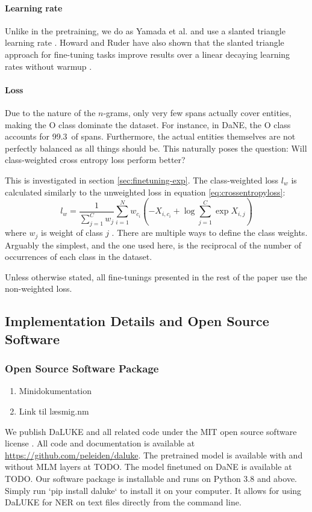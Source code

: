 \documentclass[main.tex]{subfiles}
\begin{document}
\paragraph{Learning rate}
Unlike in the pretraining, we do as Yamada et al. and use a slanted triangle learning rate \cite{yamada2020luke}.
Howard and Ruder have also shown that the slanted triangle approach for fine-tuning tasks improve results over a linear decaying learning rates without warmup \cite{howardruder2018universal}.

\paragraph{Loss}
Due to the nature of the $ n $-grams, only very few spans actually cover entities, making the O class dominate the dataset.
For instance, in DaNE, the O class accounts for 99.3\pro\ of spans.
Furthermore, the actual entities themselves are not perfectly balanced as all things should be.
This naturally poses the question: Will class-weighted cross entropy loss perform better?

This is investigated in section \ref{sec:finetuning-exp}.
The class-weighted loss $ l_w $ is calculated similarly to the unweighted loss in equation \eqref{eq:crossentropyloss}:
\begin{equation}\label{eq:w-crossentropyloss}
    l_w = \frac{1}{\sum_{j=1}^{C} w_j}
    \sum_{i=1}^N w_{c_i} \left(
        -X_{i, c_i} + \log \sum_{j=1}^C \exp X_{i, j}
    \right)
\end{equation}
where $ w_j $ is weight of class $ j $ \cite{pytorchcel}.
There are multiple ways to define the class weights.
Arguably the simplest, and the one used here, is the reciprocal of the number of occurrences of each class in the dataset.

Unless otherwise stated, all fine-tunings presented in the rest of the paper use the non-weighted loss.

\subsection{Implementation Details and Open Source Software}%
\label{sub:oss}

\subsubsection{Open Source Software Package}
\begin{enumerate}
    \item Minidokumentation
    \item Link til læsmig.nm
\end{enumerate}
We publish DaLUKE and all related code under the MIT open source software license \cite{mitlicense}.
All code and documentation is available at \url{https://github.com/peleiden/daluke}.
The pretrained model is available with and without MLM layers at TODO.
The model finetuned on DaNE is available at TODO.
Our software package is  installable and runs on Python 3.8 and above.
Simply run `pip install daluke` to install it on your computer.
It allows for using DaLUKE for NER on text files directly from the command line.
\end{document}
